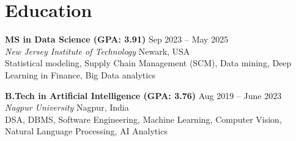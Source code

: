 \documentclass[10pt, a4paper]{article}
\begin{document}
\vspace{4pt}
\section*{Education}

\textbf{MS in Data Science (GPA: 3.91)} \hfill Sep 2023 – May 2025 \\
\textit{New Jersey Institute of Technology} \hfill Newark, USA \\
\textsc{}{ Statistical modeling, Supply Chain Management (SCM), Data mining, Deep Learning in Finance, Big Data analytics}

\vspace{2pt}

\textbf{B.Tech in Artificial Intelligence (GPA: 3.76)} \hfill Aug 2019 – June 2023 \\
\textit{Nagpur University} \hfill Nagpur, India \\
\textsc{}{ DSA, DBMS, Software Engineering, Machine Learning, Computer Vision, Natural Language Processing, AI Analytics}
\end{document}
